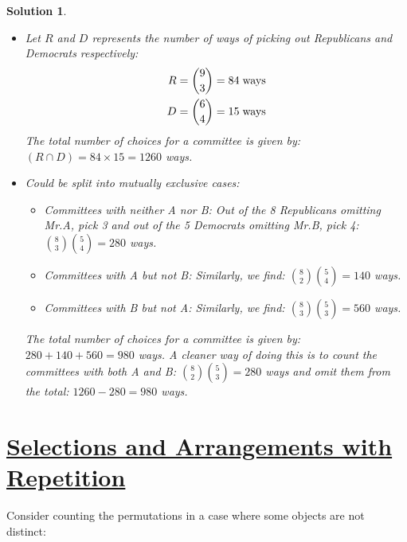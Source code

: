 \documentclass[12pt, letterpaper, onecolumn, conference, final]{IEEEtran}
\theoremstyle{definition}
\theoremstyle{plain}
\newtheorem{solution}{Solution}[section]
\begin{document}
\begin{solution}
\hfill
\begin{itemize}

\item[(a)]
Let $R$ and $D$ represents the number of ways of picking out Republicans and Democrats respectively:
\begin{equation*}
\begin{split}
R &= {9 \choose 3} = 84 \hspace{.1cm} \text{ways} \\
D &= {6 \choose 4} = 15 \hspace{.1cm} \text{ways}
\end{split}
\end{equation*}
The total number of choices for a committee is given by: $(R \cap D) = 84 \times 15 = 1260$ ways.

\vspace{.2cm}
\item[(b)]
Could be split into mutually exclusive cases:
\begin{itemize}

\vspace{.2cm}
\item[(i)]
Committees with neither A nor B: Out of the 8 Republicans omitting Mr.A, pick 3 and out of the 5 Democrats omitting Mr.B, pick 4: ${8 \choose 3} {5 \choose 4} = 280$ ways.

\vspace{.2cm}
\item[(ii)]
Committees with A but not B: Similarly, we find: ${8 \choose 2} {5 \choose 4} = 140$ ways.

\vspace{.2cm}
\item[(iii)]
Committees with B but not A: Similarly, we find: ${8 \choose 3} {5 \choose 3} = 560$ ways.

\end{itemize}
\vspace{.2cm}
The total number of choices for a committee is given by: $280+140+560 = 980$ ways. A cleaner way of doing this is to count the committees with both A and B: ${8 \choose 2} {5 \choose 3} = 280$ ways and omit them from the total: $1260 - 280 = 980$ ways.

\end{itemize}
\end{solution}

\newpage
\section{\textbf{\underline{Selections and Arrangements with Repetition}}}
\vspace{.3cm}
\noindent
Consider counting the permutations in a case where some objects are not distinct:
\end{document}
